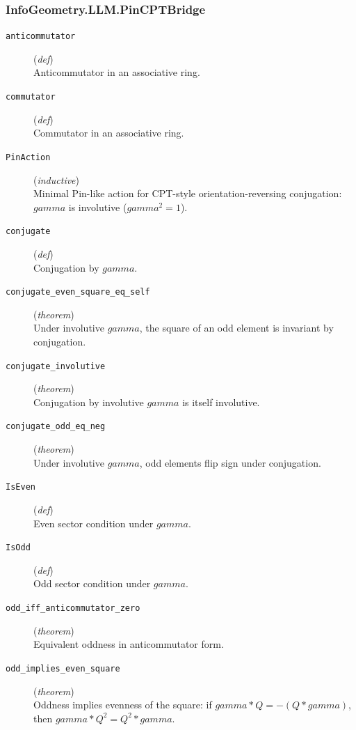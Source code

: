 \documentclass[11pt,a4paper]{article}
\begin{document}
\subsubsection*{InfoGeometry.LLM.PinCPTBridge}
\begin{description}
  \item[\texttt{anticommutator}] (\textit{def}) \\ Anticommutator in an associative ring.
  \item[\texttt{commutator}] (\textit{def}) \\ Commutator in an associative ring.
  \item[\texttt{PinAction}] (\textit{inductive}) \\ Minimal Pin-like action for CPT-style orientation-reversing conjugation: 
$gamma$ is involutive ($gamma^2 = 1$).
  \item[\texttt{conjugate}] (\textit{def}) \\ Conjugation by $gamma$.
  \item[\texttt{conjugate\_even\_square\_eq\_self}] (\textit{theorem}) \\ Under involutive $gamma$, the square of an odd element is invariant by conjugation.
  \item[\texttt{conjugate\_involutive}] (\textit{theorem}) \\ Conjugation by involutive $gamma$ is itself involutive.
  \item[\texttt{conjugate\_odd\_eq\_neg}] (\textit{theorem}) \\ Under involutive $gamma$, odd elements flip sign under conjugation.
  \item[\texttt{IsEven}] (\textit{def}) \\ Even sector condition under $gamma$.
  \item[\texttt{IsOdd}] (\textit{def}) \\ Odd sector condition under $gamma$.
  \item[\texttt{odd\_iff\_anticommutator\_zero}] (\textit{theorem}) \\ Equivalent oddness in anticommutator form.
  \item[\texttt{odd\_implies\_even\_square}] (\textit{theorem}) \\ Oddness implies evenness of the square: 
if $gamma * Q = -(Q * gamma)$, then $gamma * Q^2  = Q^2  * gamma$.
\end{description}
\end{document}
